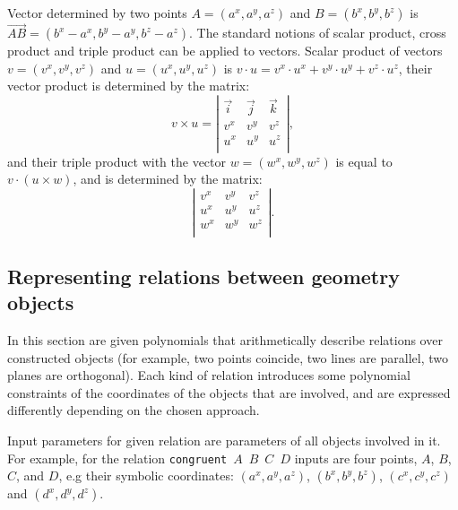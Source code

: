 \documentclass[final,1p,times,authoryear]{elsarticle}
\begin{document}
Vector determined by two points $A = (a^x, a^y, a^z)$ and
$B = (b^x, b^y, b^z)$ is
$\overrightarrow{AB} = (b^x- a^x, b^y - a^y, b^z - a^z)$. The standard
notions of scalar product, cross product and triple product can be
applied to vectors. Scalar product of vectors $v = (v^x, v^y, v^z)$
and $u = (u^x, u^y, u^z)$ is
$v\cdot u = v^x\cdot u^x+ v^y\cdot u^y + v^z\cdot u^z$, their vector
product is determined by the matrix:
$$ v\times u = \left|\begin{array}{ccc} \overrightarrow{i} & \overrightarrow{j} & \overrightarrow{k} \\ 
                       v^x& v^y & v^z \\
                       u^x& u^y & u^z \\
\end{array}\right|,$$
and their triple product with the vector $w = (w^x, w^y, w^z)$ is
equal to $v\cdot (u \times w)$, and is determined by the matrix:
$$\left|\begin{array}{ccc} v^x& v^y & v^z \\ u^x& u^y
  & u^z \\ w^x& w^y & w^z \\
\end{array}\right|.$$


\subsection{Representing relations between geometry objects}
In this section are given polynomials that arithmetically describe
relations over constructed objects (for example, two points coincide,
two lines are parallel, two planes are orthogonal).  Each kind of
relation introduces some polynomial constraints of the coordinates of
the objects that are involved, and are expressed differently depending
on the chosen approach.

Input parameters for given relation are parameters of all objects
involved in it. For example, for the relation \mbox{{\tt congruent}
  $A$ $B$ $C$ $D$} inputs are four points, $A$, $B$, $C$, and $D$, e.g
their symbolic coordinates: $(a^x, a^y, a^z)$, $(b^x, b^y, b^z)$,
$(c^x, c^y, c^z)$ and $(d^x, d^y, d^z)$.
\end{document}

